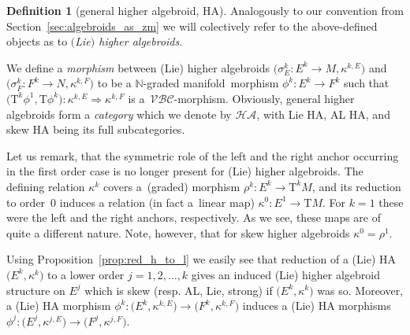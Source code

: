 \documentclass[10pt,a4paper]{amsart}
\newcommand{\grB}{{$\N$-graded manifold}}
\newcommand{\N}{\mathbb{N}}
\newcommand{\ra}{\rightarrow}
\newcommand{\mZM}{\Rightarrow}
\newcommand{\T}{\mathrm{T}} %
\newcommand{\TT}[1]{\mathrm{T}^{#1}} %
\newcommand{\catZM}{{\mathcal{VBC}}} %
\newcommand{\catHA}{\mathcal{HA}} %
\numberwithin{equation}{section}
\theoremstyle{definition}
\newtheorem{df}[thm]{Definition}
\begin{document}
\begin{df}[general higher algebroid, HA]
Analogously to our convention from Section~\ref{sec:algebroids_as_zm} we will colectively refer to the above-defined objects as to \emph{$($Lie$)$ higher algebroids}.

We define a \emph{morphism} between (Lie) higher algebroids $\big(\sigma^k_E\colon E^k\ra M, \kappa^{k,E}\big)$ and $\big(\sigma^k_F\colon F^k\ra N, \kappa^{k,F}\big)$ to be a \grB\ morphism $\phi^k\colon E^k\ra F^k$ such that $\big(\TT{k} \phi^1, \T \phi^k\big)\colon \kappa^{k,E}\mZM \kappa^{k,F}$ is a~$\catZM$-morphism. Obviously, general higher algebroids form a \emph{category} which we denote by $\catHA$, with Lie HA, AL HA, and skew HA being its full subcategories.
\end{df}

Let us remark, that the symmetric role of the left and the right anchor occurring in the first order case is no longer present for (Lie) higher algebroids. The defining relation $\kappa^k$ covers a~(graded) morphism $\rho^k\colon E^k\ra\TT{k}M$, and its reduction to order~0 induces a relation (in fact a~linear map) $\kappa^0\colon E^1\ra \T M$. For $k=1$ these were the left and the right anchors, respectively. As we see, these maps are of quite a different nature. Note, however, that for skew higher algebroids $\kappa^0=\rho^1$.

Using Proposition~\ref{prop:red_h_to_l} we easily see that reduction of a (Lie) HA $\big(E^k, \kappa^k\big)$ to a lower order $j=1,2,\hdots,k$ gives an induced (Lie) higher algebroid structure on $E^j$ which is skew (resp. AL, Lie, strong) if $\big(E^k, \kappa^k\big)$ was so. Moreover, a (Lie) HA morphism $\phi^k\colon \big(E^k, \kappa^{k,E}\big)\ra \big(F^k, \kappa^{k,F}\big)$ induces a (Lie) HA morphisms $\phi^j\colon \big(E^j, \kappa^{j,E}\big)\ra \big(F^j, \kappa^{j,F}\big)$.
\end{document}

